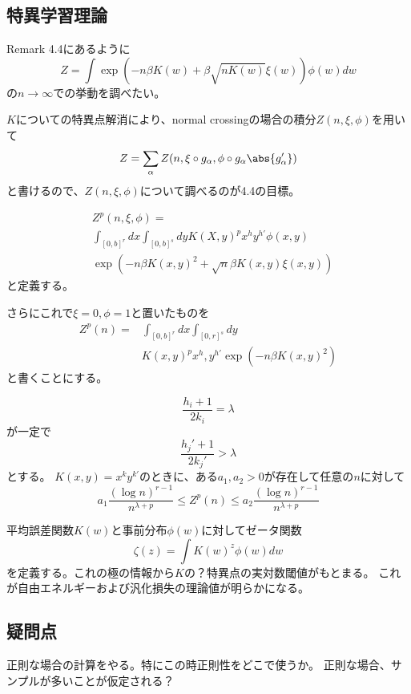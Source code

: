\documentclass[uplatex, slide, papersize]{jsarticle}
\begin{document}
\subsection*{特異学習理論}
Remark 4.4にあるように
\[
Z=\int\exp(-n\beta K(w)+\beta\sqrt{nK(w)}\xi(w))\phi(w)dw
\]
の$n\to\infty$での挙動を調べたい。
\newpage

$K$についての特異点解消により、normal crossingの場合の積分$Z(n,\xi,\phi)$を用いて
\[
Z=\sum_\alpha Z(n,\xi\circ g_\alpha,\phi\circ g_\alpha\abs{g'_\alpha})
\]
と書けるので、$Z(n,\xi,\phi)$について調べるのが4.4の目標。

\newpage
\begin{align*}
&Z^p(n,\xi,\phi)=\\
&\int_{[0,b]^r}dx\int_{[0,b]^s}dyK(X,y)^px^hy^{h'}\phi(x,y)\\ &\exp(-n\beta K(x,y)^2+\sqrt{n}\beta K(x,y)\xi(x,y))
\end{align*}
と定義する。
\newpage

さらにこれで$\xi=0, \phi=1$と置いたものを
\begin{align*}
Z^p(n)=&\int_{[0,b]^r}dx\int_{[0,r]^s}dy\\&K(x,y)^px^h,y^{h'}\exp(-n\beta K(x,y)^2)
\end{align*}
と書くことにする。

\newpage

\begin{thm}[Theorem 4.7]
\[
\frac{h_i+1}{2k_i}=\lambda
\]
が一定で
\[
\frac{h_j'+1}{2k_j'}>\lambda
\]
とする。
$K(x,y)=x^ky^{k'}$のときに、ある$a_1,a_2>0$が存在して任意の$n$に対して
\[
a_1\frac{(\log n)^{r-1}}{n^{\lambda+p}}\leq Z^p(n)\leq a_2\frac{(\log n)^{r-1}}{n^{\lambda+p}}
\]
\end{thm}

平均誤差関数$K(w)$と事前分布$\phi(w)$に対してゼータ関数
\[
\zeta(z)=\int K(w)^z\phi(w)dw
\]
を定義する。これの極の情報から$K$の？特異点の実対数閾値がもとまる。
これが自由エネルギーおよび汎化損失の理論値が明らかになる。

\newpage

\subsection{疑問点}
正則な場合の計算をやる。特にこの時正則性をどこで使うか。
正則な場合、サンプルが多いことが仮定される？
\end{document}
